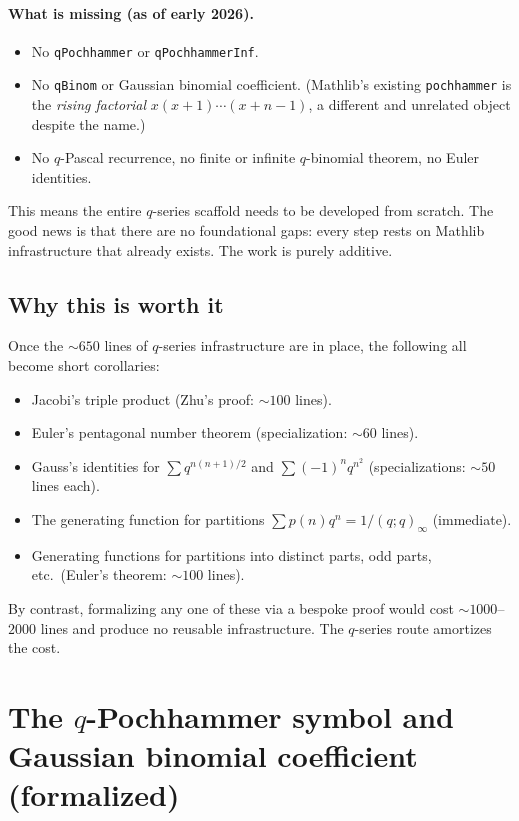 \paragraph{What is missing (as of early 2026).}
\begin{itemize}\item No \texttt{qPochhammer} or \texttt{qPochhammerInf}.
\item No \texttt{qBinom} or Gaussian binomial coefficient. (Mathlib's existing \texttt{pochhammer} is the \emph{rising factorial} $x(x+1)\cdots(x+n-1)$, a different and unrelated object despite the name.)
\item No $q$-Pascal recurrence, no finite or infinite $q$-binomial theorem, no Euler identities.
\end{itemize}

This means the entire $q$-series scaffold needs to be developed from scratch. The good news is that there are no foundational gaps: every step rests on Mathlib infrastructure that already exists. The work is purely additive.

\subsection{Why this is worth it}

Once the $\sim 650$ lines of $q$-series infrastructure are in place, the following all become short corollaries:
\begin{itemize}\item Jacobi's triple product (Zhu's proof: $\sim 100$ lines).
\item Euler's pentagonal number theorem (specialization: $\sim 60$ lines).
\item Gauss's identities for $\sum q^{n(n+1)/2}$ and $\sum (-1)^n q^{n^2}$ (specializations: $\sim 50$ lines each).
\item The generating function for partitions $\sum p(n) q^n = 1/(q;q)_\infty$ (immediate).
\item Generating functions for partitions into distinct parts, odd parts, etc.\ (Euler's theorem: $\sim 100$ lines).
\end{itemize}
By contrast, formalizing any one of these via a bespoke proof would cost $\sim 1000$--$2000$ lines and produce no reusable infrastructure. The $q$-series route amortizes the cost.

\section{The $q$-Pochhammer symbol and Gaussian binomial coefficient (formalized)}
\label{sec:qPochhammer-formalized}

